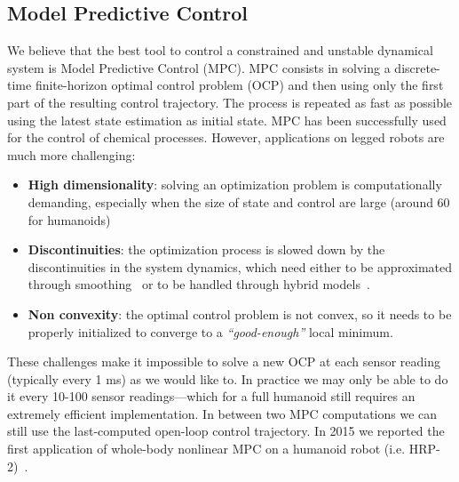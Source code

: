 \subsection{Model Predictive Control}
We believe that the best tool to control a constrained and unstable dynamical system is Model Predictive Control (MPC).
MPC consists in solving a discrete-time finite-horizon optimal control problem (OCP) and then using only the first part of the resulting control trajectory.
The process is repeated as fast as possible using the latest state estimation as initial state.
MPC has been successfully used for the control of chemical processes.
However, applications on legged robots are much more challenging:
\begin{itemize}
\item \textbf{High dimensionality}: solving an optimization problem is computationally demanding, especially when the size of state and control are large (around 60 for humanoids)
\item \textbf{Discontinuities}: the optimization process is slowed down by the discontinuities in the system dynamics, which need either to be approximated through smoothing~\citep{Todorov} or to be handled through hybrid models~\citep{Diehl2009a}.
\item \textbf{Non convexity}: the optimal control problem is not convex, so it needs to be properly initialized to converge to a \emph{``good-enough''} local minimum.
\end{itemize}
These challenges make it impossible to solve a new OCP at each sensor reading (typically every 1 ms) as we would like to. 
In practice we may only be able to do it every 10-100 sensor readings---which for a full humanoid still requires an extremely efficient implementation. 
In between two MPC computations we can still use the last-computed open-loop control trajectory.
In 2015 we reported the first application of whole-body nonlinear MPC on a humanoid robot (i.e. HRP-2)~\citep{Koenemann2015}.

